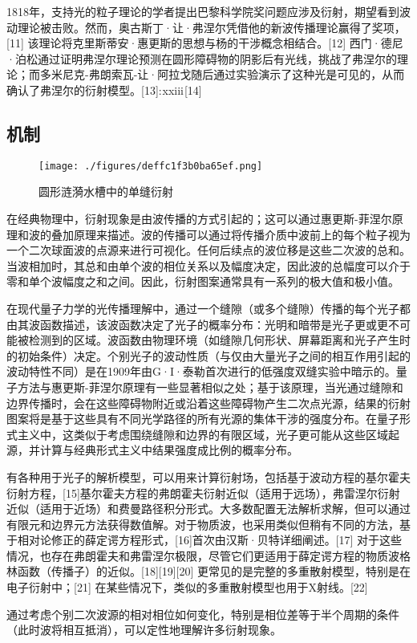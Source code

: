 1818年，支持光的粒子理论的学者提出巴黎科学院奖问题应涉及衍射，期望看到波动理论被击败。然而，奥古斯丁·让·弗涅尔凭借他的新波传播理论赢得了奖项，[11] 该理论将克里斯蒂安·惠更斯的思想与杨的干涉概念相结合。[12] 西门·德尼·泊松通过证明弗涅尔理论预测在圆形障碍物的阴影后有光线，挑战了弗涅尔的理论；而多米尼克-弗朗索瓦-让·阿拉戈随后通过实验演示了这种光是可见的，从而确认了弗涅尔的衍射模型。[13]: xxiii [14]
\subsection{机制}
\begin{figure}[ht]
\centering
\texttt{[image: ./figures/deffc1f3b0ba65ef.png]}
\caption{圆形涟漪水槽中的单缝衍射} \label{fig_YS_5}
\end{figure}
在经典物理中，衍射现象是由波传播的方式引起的；这可以通过惠更斯-菲涅尔原理和波的叠加原理来描述。波的传播可以通过将传播介质中波前上的每个粒子视为一个二次球面波的点源来进行可视化。任何后续点的波位移是这些二次波的总和。当波相加时，其总和由单个波的相位关系以及幅度决定，因此波的总幅度可以介于零和单个波幅度之和之间。因此，衍射图案通常具有一系列的极大值和极小值。

在现代量子力学的光传播理解中，通过一个缝隙（或多个缝隙）传播的每个光子都由其波函数描述，该波函数决定了光子的概率分布：光明和暗带是光子更或更不可能被检测到的区域。波函数由物理环境（如缝隙几何形状、屏幕距离和光子产生时的初始条件）决定。个别光子的波动性质（与仅由大量光子之间的相互作用引起的波动特性不同）是在1909年由G·I·泰勒首次进行的低强度双缝实验中暗示的。量子方法与惠更斯-菲涅尔原理有一些显著相似之处；基于该原理，当光通过缝隙和边界传播时，会在这些障碍物附近或沿着这些障碍物产生二次点光源，结果的衍射图案将是基于这些具有不同光学路径的所有光源的集体干涉的强度分布。在量子形式主义中，这类似于考虑围绕缝隙和边界的有限区域，光子更可能从这些区域起源，并计算与经典形式主义中结果强度成比例的概率分布。

有各种用于光子的解析模型，可以用来计算衍射场，包括基于波动方程的基尔霍夫衍射方程，[15]基尔霍夫方程的弗朗霍夫衍射近似（适用于远场），弗雷涅尔衍射近似（适用于近场）和费曼路径积分形式。大多数配置无法解析求解，但可以通过有限元和边界元方法获得数值解。对于物质波，也采用类似但稍有不同的方法，基于相对论修正的薛定谔方程形式，[16]首次由汉斯·贝特详细阐述。[17] 对于这些情况，也存在弗朗霍夫和弗雷涅尔极限，尽管它们更适用于薛定谔方程的物质波格林函数（传播子）的近似。[18][19][20] 更常见的是完整的多重散射模型，特别是在电子衍射中；[21] 在某些情况下，类似的多重散射模型也用于X射线。[22]

通过考虑个别二次波源的相对相位如何变化，特别是相位差等于半个周期的条件（此时波将相互抵消），可以定性地理解许多衍射现象。

